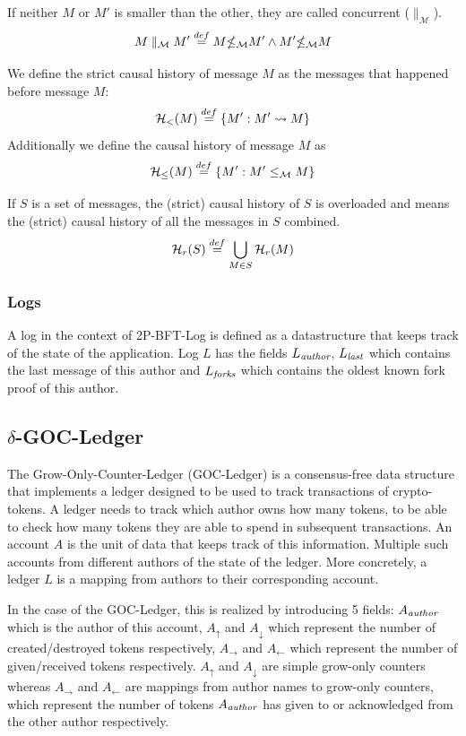 \documentclass{article}
\begin{document}
If neither $M$ or $M'$ is smaller than the other, they are called concurrent ($\parallel_\mathcal{M}$). 
\[
    M \parallel_\mathcal{M} M' \stackrel{def}{=} M {\nleq_\mathcal{M}} M' \land M' {\nleq_\mathcal{M}} M
\]

We define the strict causal history of message $M$ as the messages that happened before message $M$:
\[
    \mathcal H_<(M) \stackrel{def}{=} \{M' : M' \rightsquigarrow M\}
\]
Additionally we define the causal history of message $M$ as
\[
    \mathcal H_\le(M) \stackrel{def}{=} \{M' : M' \le_\mathcal{M} M\}
\]

If $S$ is a set of messages, the (strict) causal history of $S$ is overloaded and means the (strict) causal history of all the messages in $S$ combined.
\[
    \mathcal H_r(S) \stackrel{def}{=} \bigcup_{M \in S}\mathcal H_r(M)
\]


\subsubsection{Logs} 
A log in the context of 2P-BFT-Log is defined as a datastructure that keeps track of the state of the application. Log $L$ has the fields $L_\emph{author}$, $L_\emph{last}$ which contains the last message of this author and $L_\emph{forks}$ which contains the oldest known fork proof of this author. 

\subsection{\(\delta\)-GOC-Ledger}

The Grow-Only-Counter-Ledger (GOC-Ledger) is a consensus-free data structure that implements a ledger designed to be used to track transactions of crypto-tokens. A ledger needs to track which author owns how many tokens, to be able to check how many tokens they are able to spend in subsequent transactions. An account $A$ is the unit of data that keeps track of this information. Multiple such accounts from different authors of the state of the ledger. More concretely, a ledger $L$ is a mapping from authors to their corresponding account.

In the case of the GOC-Ledger, this is realized by introducing 5 fields: $A_\emph{author}$ which is the author of this account, $A_\uparrow$ and $A_\downarrow$ which represent the number of created/destroyed tokens respectively, $A_\rightarrow$ and $A_\leftarrow$ which represent the number of given/received tokens respectively. $A_\uparrow$ and $A_\downarrow$ are simple grow-only counters whereas $A_\rightarrow$ and $A_\leftarrow$ are mappings from author names to grow-only counters, which represent the number of tokens $A_\emph{author}$ has given to or acknowledged from the other author respectively.
\end{document}
